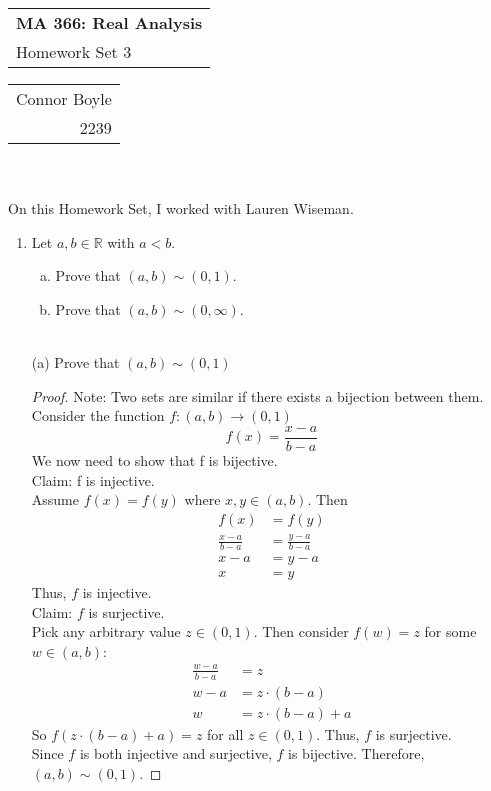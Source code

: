 \documentclass{amsart}
\def\name{Connor Boyle} %
\def\CM{2239} %
\def\hwnum{3} %
\begin{document}
\noindent
\thispagestyle{firststyle}
\begin{tabular}{l}
{\LARGE \textbf{MA 366: Real Analysis} }\\
{\Large Homework Set \hwnum}
\end{tabular} \hfill \begin{tabular}{r}
                        \name \\
                        \CM
                        \end{tabular}

\noindent \hrulefill \\\\
On this Homework Set, I worked with Lauren Wiseman.\\
\begin{enumerate}[1.]
\item Let $a, b \in \mathbb R$ with $a<b$.
    \begin{enumerate}[(a)]
    \item Prove that $(a,b)\sim(0,1)$.
    \item Prove that $(a,b)\sim(0,\infty)$.\\\\
    \end{enumerate} 

(a) Prove that $(a,b) \sim (0,1)$
\begin{proof}
Note: Two sets are similar if there exists a bijection between them. Consider the function $f: (a,b) \rightarrow (0,1)$
\[
    f(x) = \frac{x-a}{b-a}
\]
We now need to show that f is bijective. \\
Claim: f is injective.\\
Assume $f(x) = f(y)$ where $x,y\in(a,b)$. Then
\begin{align*}
    f(x) &= f(y) \\
    \frac{x-a}{b-a} &= \frac{y-a}{b-a} \\
    x - a &= y - a \\
    x &= y
\end{align*}
Thus, $f$ is injective. \\
Claim: $f$ is surjective. \\
Pick any arbitrary value $z \in (0,1)$. Then consider $f(w) = z$ for some $w\in(a,b)$:
\begin{align*}
    \frac{w - a}{b - a} &= z \\
    w - a &= z\cdot (b - a) \\
    w &= z \cdot (b - a) + a
\end{align*}
So $f(z\cdot (b-a) + a) = z$ for all $z \in (0,1)$.
Thus, $f$ is surjective. \\
Since $f$ is both injective and surjective, $f$ is bijective. 
Therefore, $(a,b) \sim (0,1)$.
\end{proof}


\end{enumerate}
\end{document}
